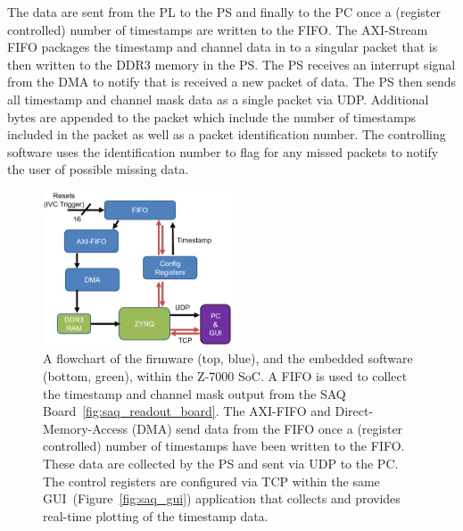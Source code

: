 The data are sent from the PL to the PS and finally to the PC once a (register controlled) number of timestamps are written to the FIFO.
The AXI-Stream FIFO packages the timestamp and channel data in to a singular packet that is then written to the DDR3 memory in the PS.
The PS receives an interrupt signal from the DMA to notify that is received a new packet of data.
The PS then sends all timestamp and channel mask data as a single packet via UDP.
Additional bytes are appended to the packet which include the number of timestamps included in the packet as well as a packet identification number.
The controlling software uses the identification number to flag for any missed packets to notify the user of possible missing data.

\begin{figure}[]
\centering
\includegraphics[width=0.5\textwidth]{images/saq_daq_firmware_summary.png}
\caption{A flowchart of the firmware (top, blue), and the embedded software (bottom, green), within the Z-7000 SoC.
A FIFO is used to collect the timestamp and channel mask output from the SAQ Board~\ref{fig:saq_readout_board}.
The AXI-FIFO and Direct-Memory-Access (DMA) send data from the FIFO once a (register controlled) number of timestamps have been written to the FIFO.
These data are collected by the PS and sent via UDP to the PC.
The control registers are configured via TCP within the same GUI~(Figure~\ref{fig:saq_gui}) application that collects and provides real-time plotting of the timestamp data.
}
\label{fig:saq_firmware}
\end{figure}

